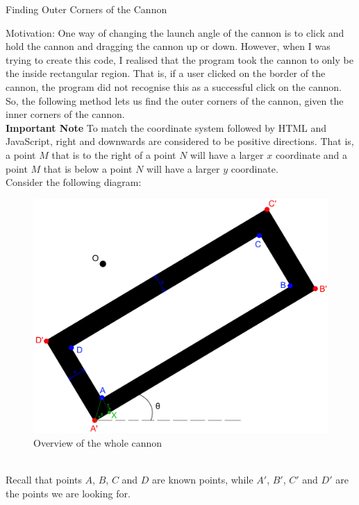 \documentclass{article}
\begin{document}
\begin{center} \huge Finding Outer Corners of the Cannon \\
\end{center}
Motivation: One way of changing the launch angle of the cannon is to click and hold the cannon and dragging the cannon up or down. However, when I was trying to create this code, I realised that the program took the cannon to only be the inside rectangular region. That is, if a user clicked on the border of the cannon, the program did not recognise this as a successful click on the cannon. So, the following method lets us find the outer corners of the cannon, given the inner corners of the cannon. \vspace{\baselineskip}\\
\textbf{Important Note}
\indent To match the coordinate system followed by HTML and JavaScript, right and downwards are considered to be positive directions. That is, a point $M$ that is to the right of a point $N$ will have a larger $x$ coordinate and a point $M$ that is below a point $N$ will have a larger $y$ coordinate.\vspace{\baselineskip}\\
Consider the following diagram:\\
\begin{figure}[h]
	\centering
	\includegraphics[scale=0.08]{Images/FindingOuterCornersOfCannon_1.png}
	\caption{Overview of the whole cannon}
\end{figure}\\
Recall that points $A$, $B$, $C$ and $D$ are known points, while $A'$, $B'$, $C'$ and $D'$ are the points we are looking for.\vspace{\baselineskip}\\
\end{document}
